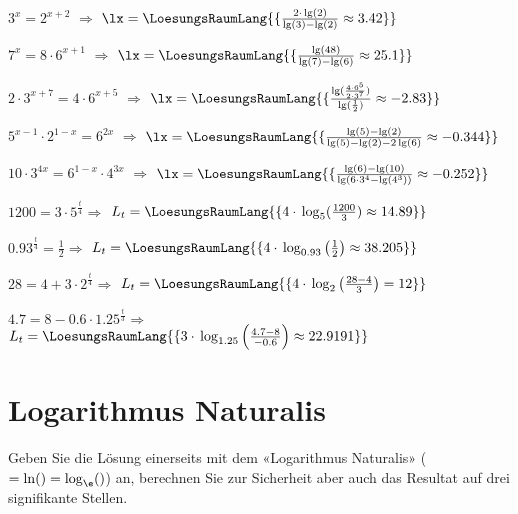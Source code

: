\begin{bbwAufgabenBlock}
\item $3^x=2^{x+2}$ $\Longrightarrow$ $\lx=\LoesungsRaumLang{\{\frac{2\cdot{}\lg(2)}{\lg(3)-\lg(2)} \approx  3.42  \}}$ \plz{}
\item $7^x=8\cdot{}6^{x+1}$ $\Longrightarrow$ $\lx=\LoesungsRaumLang{\{\frac{\lg(48)}{\lg(7)-\lg(6)} \approx 25.1   \}}$ \plz{}
\item $2\cdot{}3^{x+7}=4\cdot{}6^{x+5}$ $\Longrightarrow$ $\lx=\LoesungsRaumLang{\{\frac{\lg(\frac{4\cdot{}6^5}{2\cdot{}3^7})}{\lg(\frac12)} \approx  -2.83  \}}$ \plz{}
\item $5^{x-1}\cdot{}2^{1-x}=6^{2x}$ $\Longrightarrow$ $\lx=\LoesungsRaumLang{\{\frac{\lg(5)-\lg(2)}{\lg(5)-\lg(2)-2\lg(6)} \approx -0.344   \}}$ \plz{}
\item $10\cdot{}3^{4x} = 6^{1-x}\cdot{}4^{3x}$ $\Longrightarrow$ $\lx=\LoesungsRaumLang{\{\frac{\lg(6)-\lg(10)}{\lg(6\cdot{}3^4 - \lg(4^3))} \approx -0.252   \}}$ \plz{}

\noTRAINER{\newpage}

\item $1200=3\cdot{} 5^{\frac{t}{4}} \Longrightarrow$ $L_t = \LoesungsRaumLang{\{ 4\cdot{}\log_5(\frac{1200}3)\approx 14.89   \}}$ \plz{}

\item $0.93^{\frac{t}4}=\frac12 \Longrightarrow$ $L_t
= \LoesungsRaumLang{\{
4\cdot{}\log_{0.93}\left(\frac12\right) \approx 38.205   \}}$ \plz{}

\item $28 = 4 + 3\cdot{} 2^\frac{t}{4} \Longrightarrow$ $L_t
= \LoesungsRaumLang{\{ 4\cdot{} \log_2\left(\frac{28-4}3\right) = 12 \}}$ \plz{}

\noTRAINER{\newpage}

\item $4.7 = 8 - 0.6\cdot{} 1.25^{\frac{t}{3}} \Longrightarrow$ $L_t
= \LoesungsRaumLang{\{
3\cdot{} \log_{1.25}\left(\frac{4.7-8}{-0.6}\right) \approx 22.9191  \}}$ \plz{}

\end{bbwAufgabenBlock}

\platzFuerBerechnungenBisEndeSeite{}




\section{Logarithmus Naturalis}
Geben Sie die Lösung einerseits mit dem «Logarithmus Naturalis»
($=\ln() = \log_{\e}()$) an, berechnen Sie zur Sicherheit aber auch das
Resultat auf drei signifikante Stellen.

